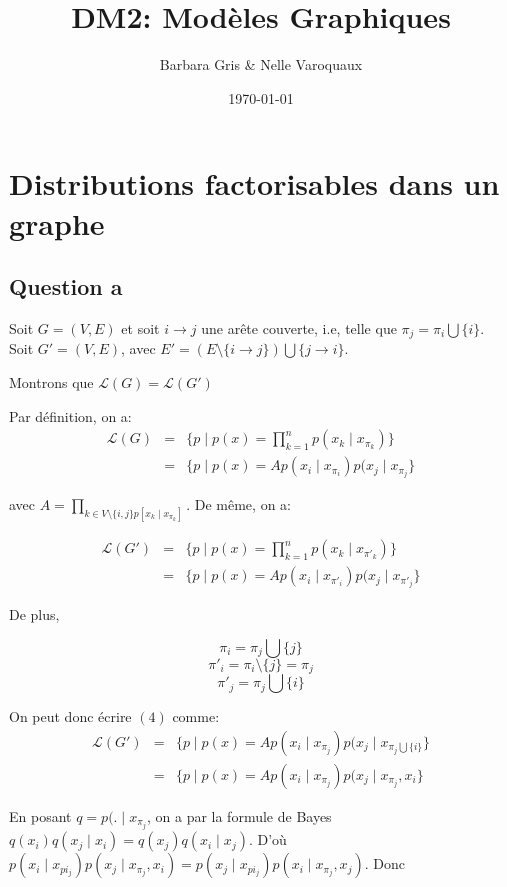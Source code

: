 \documentclass{article}
\date{\today}
\title{DM2: Modèles Graphiques}
\author{Barbara Gris \& Nelle Varoquaux}
\begin{document}
\maketitle
\tableofcontents{}
\vfill \eject

\section{Distributions factorisables dans un graphe}
\subsection{Question a}

Soit $G = (V, E)$ et soit $i \rightarrow j$ une arête couverte, i.e, telle que
$\pi_j = \pi_i \bigcup \{i\}$.
Soit $G'= (V,E)$, avec $E' = (E \setminus \{i \rightarrow j\}) \bigcup \{j \rightarrow i\}$.

Montrons que $\mathcal{L}(G) = \mathcal{L}(G')$


Par définition, on a:
\begin{align}
\mathcal{L}(G) & = & \{ p \mid p(x) = \prod_{k = 1}^{n} p(x_k \mid x_{\pi_k}) \} \\
	       & = & \{ p \mid p(x) = A p(x_i \mid x_{\pi_i}) p(x_j \mid x_{\pi_j} \}
\end{align}

avec $A = \prod_{k \in V \setminus \{i, j\} p[x_k \mid x_{\pi_k}]}$. De même, on a:

\begin{align}
\mathcal{L}(G') & = & \{ p \mid p(x) = \prod_{k = 1}^{n} p(x_k \mid x_{\pi'_k}) \} \\
		& = & \{ p \mid p(x) = A p(x_i \mid x_{\pi'_i}) p(x_j \mid x_{\pi'_j} \}
\end{align}

De plus,

$$\pi_i = \pi_j \bigcup \{ j \}$$
$$\pi'_i = \pi_i \setminus \{ j \} = \pi_j$$
$$\pi'_j = \pi_j \bigcup \{ i \}$$

On peut donc écrire $(4)$ comme:
\begin{align}
\mathcal{L}(G') & = & \{ p \mid p(x) = A p(x_i \mid x_{\pi_j}) p(x_j \mid x_{\pi_j \bigcup \{ i \}}  \} \\
		& = & \{ p \mid p(x) = A p(x_i \mid x_{\pi_j}) p(x_j \mid x_{\pi_j}, x_i \}
\end{align}

En posant $q = p(. \mid x_{\pi_j}$, on a par la formule de Bayes $q(x_i)q(x_j \mid x_i) =  q(x_j)q(x_i \mid x_j)$.
D'où $p(x_i \mid x_{pi_j})p(x_j \mid x_{\pi_j}, x_i) = p(x_j \mid x_{pi_j})p(x_i \mid x_{\pi_j}, x_j)$. Donc
\end{document}
